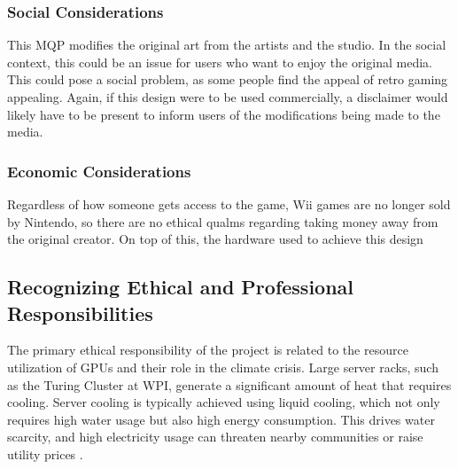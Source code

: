 \documentclass{article}
\begin{document}
        \subsubsection{Social Considerations}
        \noindent This MQP modifies the original art from the artists and the studio. In the social context, this could be an issue for users who want to enjoy the original media. This could pose a social problem, as some people find the appeal of retro gaming appealing. Again, if this design were to be used commercially, a disclaimer would likely have to be present to inform users of the modifications being made to the media. 

        \subsubsection{Economic Considerations}
        \noindent Regardless of how someone gets access to the game, Wii games are no longer sold by Nintendo, so there are no ethical qualms regarding taking money away from the original creator. On top of this, the hardware used to achieve this design 
        
        
    \subsection{Recognizing Ethical and Professional Responsibilities}
    \noindent The primary ethical responsibility of the project is related to the resource utilization of GPUs and their role in the climate crisis. Large server racks, such as the Turing Cluster at WPI, generate a significant amount of heat that requires cooling. Server cooling is typically achieved using liquid cooling, which not only requires high water usage but also high energy consumption. This drives water scarcity, and high electricity usage can threaten nearby communities or raise utility prices \cite{zewe_explained_2025}. 
\end{document}
